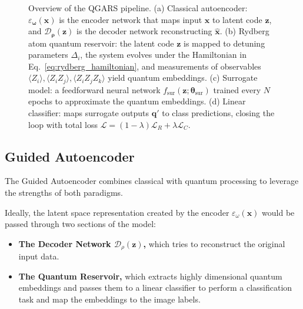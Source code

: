 \documentclass[conference]{IEEEtran}
\begin{document}
\begin{figure}[!t]
    \centering
    \label{fig:qgars}
    \caption{
    Overview of the QGARS pipeline. (a) Classical autoencoder: $\varepsilon_{\bm\omega}(\bm{x})$ is the encoder network that maps input $\bm{x}$ to latent code $\bm{z}$, and $\mathcal{D}_{\bm\rho}(\bm{z})$ is the decoder network reconstructing $\hat{\bm{x}}$. (b) Rydberg atom quantum reservoir: the latent code $\bm{z}$ is mapped to detuning parameters $\Delta_i$, the system evolves under the Hamiltonian in Eq.~\eqref{eq:rydberg_hamiltonian}, and measurements of observables $\langle Z_i\rangle,\langle Z_iZ_j\rangle,\langle Z_iZ_jZ_k\rangle$ yield quantum embeddings. (c) Surrogate model: a feedforward neural network $f_{\mathrm{sur}}(\bm{z};\bm\theta_{\mathrm{sur}})$ trained every $N$ epochs to approximate the quantum embeddings. (d) Linear classifier: maps surrogate outputs $\bm{q}'$ to class predictions, closing the loop with total loss $\mathcal{L}=(1-\lambda)\mathcal{L}_R+\lambda\mathcal{L}_C$.
    }
\end{figure}

\subsection{Guided Autoencoder}
The Guided Autoencoder combines classical with quantum processing to leverage the strengths of both paradigms.

Ideally, the latent space representation created by the encoder \(\varepsilon_\omega(\bm{x})\)
would be passed through two sections of the model:
\begin{itemize}
    \item \textbf{The Decoder Network \(\mathcal{D}_\rho(\bm{z})\),}
    which tries to reconstruct the original input data.
    \item \textbf{The Quantum Reservoir,}
    which extracts highly dimensional quantum embeddings and passes them to a linear classifier to perform a classification task and map the embeddings to the image labels.
\end{itemize}
\end{document}
